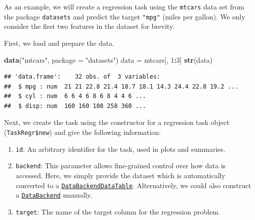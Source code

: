 \documentclass[]{scrbook}
\newenvironment{Shaded}{\begin{snugshade}}{\end{snugshade}}
\newcommand{\DataTypeTok}[1]{\textcolor[rgb]{0.13,0.29,0.53}{#1}}
\newcommand{\DecValTok}[1]{\textcolor[rgb]{0.00,0.00,0.81}{#1}}
\newcommand{\KeywordTok}[1]{\textcolor[rgb]{0.13,0.29,0.53}{\textbf{#1}}}
\newcommand{\NormalTok}[1]{#1}
\newcommand{\OperatorTok}[1]{\textcolor[rgb]{0.81,0.36,0.00}{\textbf{#1}}}
\newcommand{\StringTok}[1]{\textcolor[rgb]{0.31,0.60,0.02}{#1}}
\providecommand{\tightlist}{%
  \setlength{\itemsep}{0pt}\setlength{\parskip}{0pt}}
\renewenvironment{Shaded} {\begin{snugshade}\small} {\end{snugshade}}
\begin{document}
As an example, we will create a regression task using the \texttt{mtcars} data set from the package \texttt{datasets} and predict the target \texttt{"mpg"} (miles per gallon).
We only consider the first two features in the dataset for brevity.

First, we load and prepare the data.

\begin{Shaded}
\begin{Highlighting}[]
\KeywordTok{data}\NormalTok{(}\StringTok{"mtcars"}\NormalTok{, }\DataTypeTok{package =} \StringTok{"datasets"}\NormalTok{)}
\NormalTok{data =}\StringTok{ }\NormalTok{mtcars[, }\DecValTok{1}\OperatorTok{:}\DecValTok{3}\NormalTok{]}
\KeywordTok{str}\NormalTok{(data)}
\end{Highlighting}
\end{Shaded}

\begin{verbatim}
## 'data.frame':	32 obs. of  3 variables:
##  $ mpg : num  21 21 22.8 21.4 18.7 18.1 14.3 24.4 22.8 19.2 ...
##  $ cyl : num  6 6 4 6 8 6 8 4 4 6 ...
##  $ disp: num  160 160 108 258 360 ...
\end{verbatim}

Next, we create the task using the constructor for a regression task object (\texttt{TaskRegr\$new}) and give the following information:

\begin{enumerate}
\def\labelenumi{\arabic{enumi}.}
\tightlist
\item
  \texttt{id}: An arbitrary identifier for the task, used in plots and summaries.
\item
  \texttt{backend}: This parameter allows fine-grained control over how data is accessed.
  Here, we simply provide the dataset which is automatically converted to a \href{https://mlr3.mlr-org.com/reference/DataBackendDataTable.html}{\texttt{DataBackendDataTable}}.
  Alternatively, we could also construct a \href{https://mlr3.mlr-org.com/reference/DataBackend.html}{\texttt{DataBackend}} manually.
\item
  \texttt{target}: The name of the target column for the regression problem.
\end{enumerate}

\begin{Shaded}
\end{Shaded}
\end{document}
